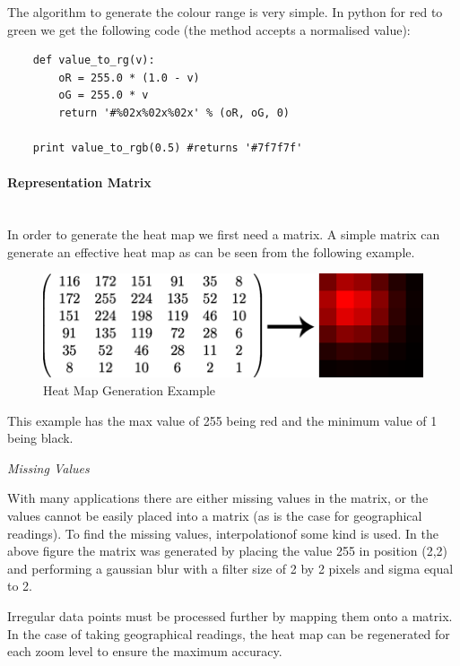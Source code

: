 The algorithm to generate the colour range is very simple. In python for red to green we get the following code (the method accepts a normalised value):

\begin{verbatim}	
	def value_to_rg(v):
	    oR = 255.0 * (1.0 - v)
	    oG = 255.0 * v
	    return '#%02x%02x%02x' % (oR, oG, 0)
	    
	print value_to_rgb(0.5) #returns '#7f7f7f'
\end{verbatim}


\paragraph{Representation Matrix} \hspace{0pt} \\

In order to generate the heat map we first need a matrix. A simple matrix can generate an effective heat map as can be seen from the following example.

\begin{figure}[H]
        \begin{center}
                \includegraphics[scale=0.5]{./images/heatmaps/HeatMapGaussianExample.png}
                \caption{Heat Map Generation Example}
        \end{center}
\end{figure}

This example has the max value of 255 being red and the minimum value of 1 being black. 

\emph{Missing Values}

With many applications there are either missing values in the matrix, or the values cannot be easily placed into a matrix (as is the case for geographical readings). To find the missing values, interpolationof some kind is used. In the above figure the matrix was generated by placing the value 255 in position (2,2) and performing a gaussian blur with a filter size of 2 by 2 pixels and sigma equal to 2. 

Irregular data points must be processed further by mapping them onto a matrix. In the case of taking geographical readings, the heat map can be regenerated for each zoom level to ensure the maximum accuracy. 

